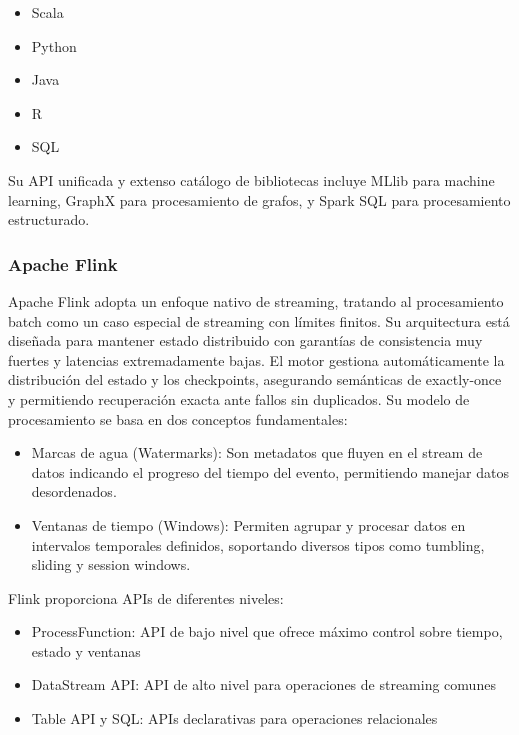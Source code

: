 \begin{itemize}
    \item Scala
    \item Python
    \item Java 
    \item R
    \item SQL
\end{itemize}

Su API unificada y extenso catálogo de bibliotecas incluye MLlib para machine learning, GraphX para procesamiento de
grafos, y Spark SQL para procesamiento estructurado.

\newpage
\subsubsection{Apache Flink}

Apache Flink adopta un enfoque nativo de streaming, tratando al procesamiento batch como un caso especial de streaming
con límites finitos. Su arquitectura está diseñada para mantener estado distribuido con garantías de consistencia muy
fuertes y latencias extremadamente bajas. El motor gestiona automáticamente la distribución del estado y los checkpoints,
asegurando semánticas de exactly-once y permitiendo recuperación exacta ante fallos sin duplicados.
Su modelo de procesamiento se basa en dos conceptos fundamentales:

\begin{itemize}
    \item Marcas de agua (Watermarks): Son metadatos que fluyen en el stream de datos indicando el progreso del tiempo del evento,
    permitiendo manejar datos desordenados.
    \item Ventanas de tiempo (Windows): Permiten agrupar y procesar datos en intervalos temporales definidos, soportando diversos
    tipos como tumbling, sliding y session windows. 
\end{itemize}

Flink proporciona APIs de diferentes niveles:

\begin{itemize}
    \item ProcessFunction: API de bajo nivel que ofrece máximo control sobre tiempo, estado y ventanas
    \item DataStream API: API de alto nivel para operaciones de streaming comunes
    \item Table API y SQL: APIs declarativas para operaciones relacionales   
\end{itemize}

